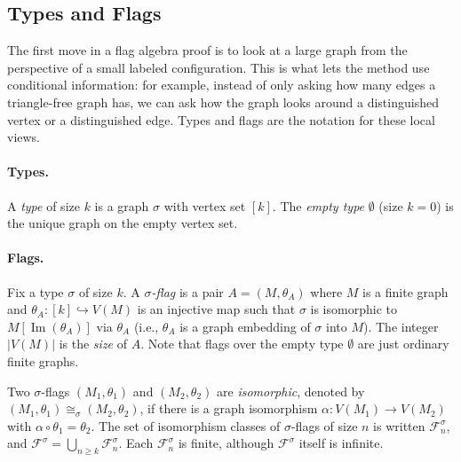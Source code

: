 \documentclass{article}
\begin{document}
\subsection{Types and Flags}

The first move in a flag algebra proof is to look at a large graph from the
perspective of a small labeled configuration.  This is what lets the method use
conditional information: for example, instead of only asking how many edges a
triangle-free graph has, we can ask how the graph looks around a distinguished
vertex or a distinguished edge.  Types and flags are the notation for these
local views.

\paragraph{Types.}
A \emph{type} of size $k$ is a graph $\sigma$ with vertex set $[k]$.
The \emph{empty type} $\emptyset$ (size $k=0$) is the unique graph on the
empty vertex set.

\paragraph{Flags.}
Fix a type $\sigma$ of size $k$.
A \emph{$\sigma$-flag} is a pair $A = (M, \theta_A)$ where $M$ is a
finite graph and $\theta_A : [k] \hookrightarrow V(M)$ is an injective map such
that $\sigma$ is isomorphic to $M[\operatorname{Im}(\theta_A)]$ via $\theta_A$
(i.e., $\theta_A$ is a graph embedding of $\sigma$ into $M$).
The integer $|V(M)|$ is the \emph{size} of $A$.  Note that
flags over the empty type $\emptyset$ are just ordinary finite graphs.

Two $\sigma$-flags $(M_1,\theta_1)$ and $(M_2,\theta_2)$ are
\emph{isomorphic}, denoted by $(M_1,\theta_1) \cong_\sigma (M_2,\theta_2)$,
if there is a graph isomorphism $\alpha: V(M_1)\to V(M_2)$
with $\alpha \circ \theta_1 = \theta_2$.  The set of isomorphism classes of
$\sigma$-flags of size $n$ is written $\mathcal{F}^\sigma_n$, and
$\mathcal{F}^\sigma = \bigcup_{n \geq k} \mathcal{F}^\sigma_n$.
Each $\mathcal{F}^\sigma_n$ is finite, although
$\mathcal{F}^\sigma$ itself is infinite.
\end{document}
